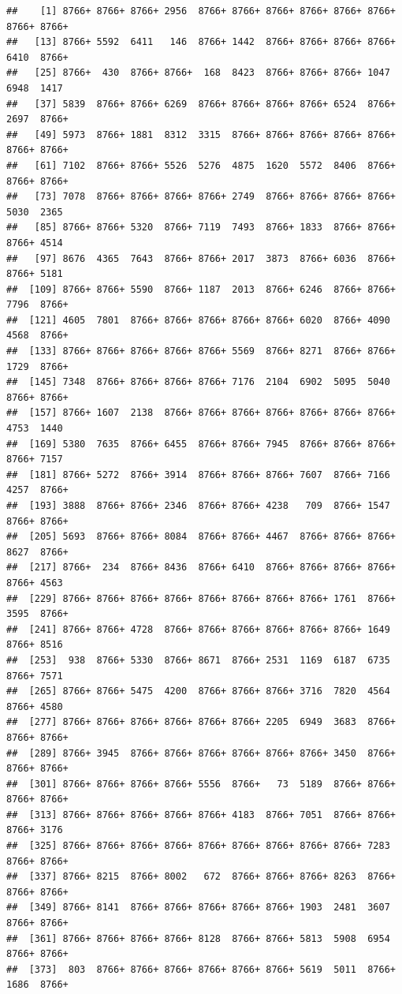 \documentclass[
]{book}
\begin{document}
\begin{verbatim}
##    [1] 8766+ 8766+ 8766+ 2956  8766+ 8766+ 8766+ 8766+ 8766+ 8766+ 8766+ 8766+
##   [13] 8766+ 5592  6411   146  8766+ 1442  8766+ 8766+ 8766+ 8766+ 6410  8766+
##   [25] 8766+  430  8766+ 8766+  168  8423  8766+ 8766+ 8766+ 1047  6948  1417 
##   [37] 5839  8766+ 8766+ 6269  8766+ 8766+ 8766+ 8766+ 6524  8766+ 2697  8766+
##   [49] 5973  8766+ 1881  8312  3315  8766+ 8766+ 8766+ 8766+ 8766+ 8766+ 8766+
##   [61] 7102  8766+ 8766+ 5526  5276  4875  1620  5572  8406  8766+ 8766+ 8766+
##   [73] 7078  8766+ 8766+ 8766+ 8766+ 2749  8766+ 8766+ 8766+ 8766+ 5030  2365 
##   [85] 8766+ 8766+ 5320  8766+ 7119  7493  8766+ 1833  8766+ 8766+ 8766+ 4514 
##   [97] 8676  4365  7643  8766+ 8766+ 2017  3873  8766+ 6036  8766+ 8766+ 5181 
##  [109] 8766+ 8766+ 5590  8766+ 1187  2013  8766+ 6246  8766+ 8766+ 7796  8766+
##  [121] 4605  7801  8766+ 8766+ 8766+ 8766+ 8766+ 6020  8766+ 4090  4568  8766+
##  [133] 8766+ 8766+ 8766+ 8766+ 8766+ 5569  8766+ 8271  8766+ 8766+ 1729  8766+
##  [145] 7348  8766+ 8766+ 8766+ 8766+ 7176  2104  6902  5095  5040  8766+ 8766+
##  [157] 8766+ 1607  2138  8766+ 8766+ 8766+ 8766+ 8766+ 8766+ 8766+ 4753  1440 
##  [169] 5380  7635  8766+ 6455  8766+ 8766+ 7945  8766+ 8766+ 8766+ 8766+ 7157 
##  [181] 8766+ 5272  8766+ 3914  8766+ 8766+ 8766+ 7607  8766+ 7166  4257  8766+
##  [193] 3888  8766+ 8766+ 2346  8766+ 8766+ 4238   709  8766+ 1547  8766+ 8766+
##  [205] 5693  8766+ 8766+ 8084  8766+ 8766+ 4467  8766+ 8766+ 8766+ 8627  8766+
##  [217] 8766+  234  8766+ 8436  8766+ 6410  8766+ 8766+ 8766+ 8766+ 8766+ 4563 
##  [229] 8766+ 8766+ 8766+ 8766+ 8766+ 8766+ 8766+ 8766+ 1761  8766+ 3595  8766+
##  [241] 8766+ 8766+ 4728  8766+ 8766+ 8766+ 8766+ 8766+ 8766+ 1649  8766+ 8516 
##  [253]  938  8766+ 5330  8766+ 8671  8766+ 2531  1169  6187  6735  8766+ 7571 
##  [265] 8766+ 8766+ 5475  4200  8766+ 8766+ 8766+ 3716  7820  4564  8766+ 4580 
##  [277] 8766+ 8766+ 8766+ 8766+ 8766+ 8766+ 2205  6949  3683  8766+ 8766+ 8766+
##  [289] 8766+ 3945  8766+ 8766+ 8766+ 8766+ 8766+ 8766+ 3450  8766+ 8766+ 8766+
##  [301] 8766+ 8766+ 8766+ 8766+ 5556  8766+   73  5189  8766+ 8766+ 8766+ 8766+
##  [313] 8766+ 8766+ 8766+ 8766+ 8766+ 4183  8766+ 7051  8766+ 8766+ 8766+ 3176 
##  [325] 8766+ 8766+ 8766+ 8766+ 8766+ 8766+ 8766+ 8766+ 8766+ 7283  8766+ 8766+
##  [337] 8766+ 8215  8766+ 8002   672  8766+ 8766+ 8766+ 8263  8766+ 8766+ 8766+
##  [349] 8766+ 8141  8766+ 8766+ 8766+ 8766+ 8766+ 1903  2481  3607  8766+ 8766+
##  [361] 8766+ 8766+ 8766+ 8766+ 8128  8766+ 8766+ 5813  5908  6954  8766+ 8766+
##  [373]  803  8766+ 8766+ 8766+ 8766+ 8766+ 8766+ 5619  5011  8766+ 1686  8766+

\end{verbatim}
\end{document}
